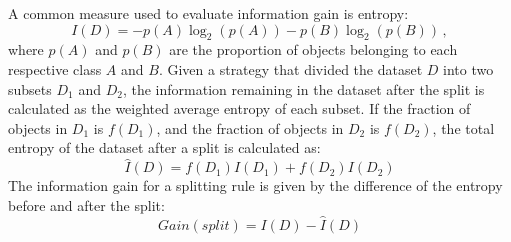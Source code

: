 A common measure used to evaluate information gain is entropy:
\begin{equation*}
    I(D) = -p(A) \log_2 (p(A)) -p(B) \log_2 (p(B)) \,,
\end{equation*}
where $p(A)$ and $p(B)$ are the proportion of objects belonging to each respective class $A$ and $B$. Given a strategy that divided the dataset $D$ into two subsets $D_1$ and $D_2$, the information remaining in the dataset after the split is calculated as the weighted average entropy of each subset.
If the fraction of objects in $D_1$ is $f(D_1)$, and the fraction of objects in $D_2$ is $f(D_2)$, the total entropy of the dataset after a split is calculated as:
\begin{equation*}
    \hat{I}(D) = f(D_1)I(D_1) + f(D_2)I(D_2)
\end{equation*}
The information gain for a splitting rule is given by the difference of the entropy before and after the split:
\begin{equation*}
    \textit{Gain}(\textit{split}) = I(D) - \hat{I}(D)
\end{equation*}


